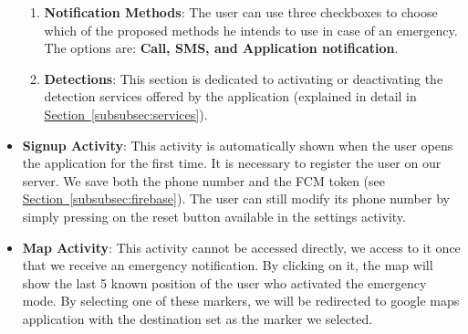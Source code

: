 \documentclass[12pt]{article}
\begin{document}
\begin{itemize}
\begin{enumerate}
        \item \textbf{Notification Methods}: The user can use three 
        checkboxes to choose which of the proposed methods he intends 
        to use in case of an emergency. The options are: 
        \textbf{Call, SMS, and Application notification}.
        \item \textbf{Detections}: This section is dedicated to 
        activating or deactivating the detection services offered by the 
        application (explained in detail in 
        \hyperref[subsubsec:services]{Section~\ref*{subsubsec:services}}).
    \end{enumerate}
    \item \textbf{Signup Activity}: This activity is automatically shown 
    when the user opens the application for the first time. It is necessary 
    to register the user on our server. We save both the phone number and the  
    FCM token (see \hyperref[subsubsec:firebase]{Section~\ref*{subsubsec:firebase}}). The user can still 
    modify its phone number by simply pressing on the reset button available 
    in the settings activity.
    \item \textbf{Map Activity}: This activity cannot be accessed directly,
    we access to it once that we receive an emergency notification. By  
    clicking on it, the map will show the last 5 known position of the user 
    who activated the emergency mode. By selecting one of these markers, we  
    will be redirected to google maps application with the destination set as 
    the marker we selected. 
\end{itemize}
\end{document}
